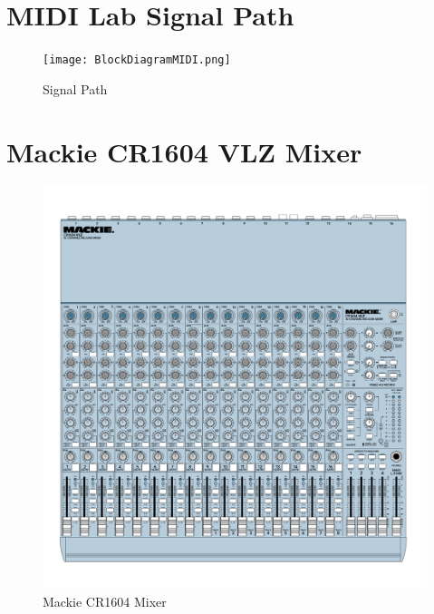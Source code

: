 \documentclass{tufte-book} %
\begin{document}
\section{MIDI Lab Signal Path} 

\begin{figure}[h]
\centering
\texttt{[image: BlockDiagramMIDI.png]}
\caption{Signal Path }
\label{fig:fullfig}


\end{figure}


\newpage
\section{Mackie CR1604 VLZ Mixer}

\begin{fullwidth}
\lipsum[5]
\end{fullwidth}

\begin{figure}[h]
\centering
\includegraphics[width=.85\textwidth]{Mackie_Manual-1.png}
\caption{Mackie CR1604 Mixer}
\label{fig:fullfig}
\end{figure}

\newpage
\end{document}
